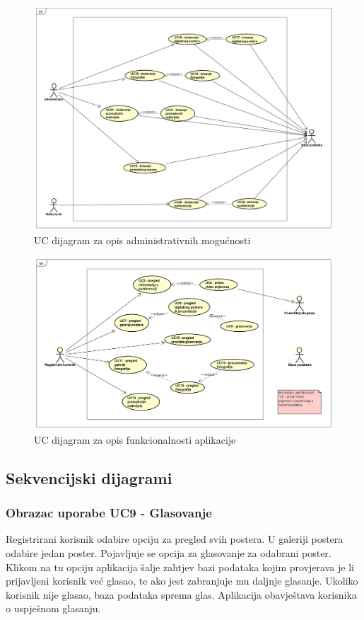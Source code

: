 					\begin{figure}
						\includegraphics[width=\linewidth]{Slike/UCDiagramAdminRevised.png}
						\caption{UC dijagram za opis administrativnih mogućnosti}
					\end{figure}
				
					\begin{figure}
						\includegraphics[width=\linewidth]{Slike/UCDiagramAppFunctionalitiesRevised.png}
						\caption{UC dijagram za opis funkcionalnosti aplikacije}
					\end{figure}
				
				\eject		
			
			\clearpage
			\subsection{Sekvencijski dijagrami}
				
				\subsubsection{Obrazac uporabe UC9 - Glasovanje}
				Registrirani korisnik odabire opciju za pregled svih postera. U galeriji postera odabire jedan poster. Pojavljuje se opcija za glasovanje za odabrani poster. Klikom na tu opciju aplikacija šalje zahtjev bazi podataka kojim provjerava je li prijavljeni korisnik već glasao, te ako jest zabranjuje mu daljnje glasanje. Ukoliko korisnik nije glasao, baza podataka sprema glas. Aplikacija obavještava korisnika o uspješnom glasanju.
				
